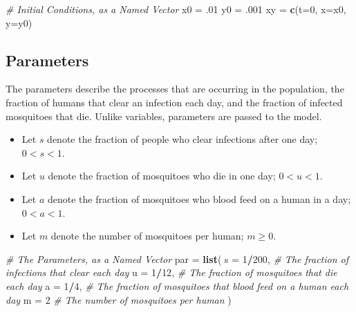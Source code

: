 \documentclass[
]{book}
\newenvironment{Shaded}{\begin{snugshade}}{\end{snugshade}}
\newcommand{\AttributeTok}[1]{\textcolor[rgb]{0.13,0.29,0.53}{#1}}
\newcommand{\CommentTok}[1]{\textcolor[rgb]{0.56,0.35,0.01}{\textit{#1}}}
\newcommand{\DecValTok}[1]{\textcolor[rgb]{0.00,0.00,0.81}{#1}}
\newcommand{\FunctionTok}[1]{\textcolor[rgb]{0.13,0.29,0.53}{\textbf{#1}}}
\newcommand{\NormalTok}[1]{#1}
\newcommand{\OtherTok}[1]{\textcolor[rgb]{0.56,0.35,0.01}{#1}}
\newcommand{\SpecialCharTok}[1]{\textcolor[rgb]{0.81,0.36,0.00}{\textbf{#1}}}
\begin{document}
\begin{Shaded}
\begin{Highlighting}[]
\CommentTok{\# Initial Conditions, as a Named Vector}
\NormalTok{x0 }\OtherTok{=}\NormalTok{ .}\DecValTok{01}
\NormalTok{y0 }\OtherTok{=}\NormalTok{ .}\DecValTok{001}
\NormalTok{xy }\OtherTok{=} \FunctionTok{c}\NormalTok{(}\AttributeTok{t=}\DecValTok{0}\NormalTok{, }\AttributeTok{x=}\NormalTok{x0, }\AttributeTok{y=}\NormalTok{y0)}
\end{Highlighting}
\end{Shaded}

\subsection{Parameters}\label{parameters}

The parameters describe the processes that are occurring in the population, the fraction of humans that clear an infection each day, and the fraction of infected mosquitoes that die. Unlike variables, parameters are passed to the model.

\begin{itemize}
\item
  Let \(s\) denote the fraction of people who clear infections after one day; \(0 < s < 1.\)
\item
  Let \(u\) denote the fraction of mosquitoes who die in one day; \(0 < u < 1.\)
\item
  Let \(a\) denote the fraction of mosquitoes who blood feed on a human in a day; \(0 < a < 1.\)
\item
  Let \(m\) denote the number of mosquitoes per human; \(m \geq 0.\)
\end{itemize}

\begin{Shaded}
\begin{Highlighting}[]
\CommentTok{\# The Parameters, as a Named Vector}
\NormalTok{par }\OtherTok{=} \FunctionTok{list}\NormalTok{(}
  \AttributeTok{s =} \DecValTok{1}\SpecialCharTok{/}\DecValTok{200}\NormalTok{, }\CommentTok{\# The fraction of infections that clear each day}
  \AttributeTok{u =} \DecValTok{1}\SpecialCharTok{/}\DecValTok{12}\NormalTok{,  }\CommentTok{\# The fraction of mosquitoes that die each day}
  \AttributeTok{a =} \DecValTok{1}\SpecialCharTok{/}\DecValTok{4}\NormalTok{,   }\CommentTok{\# The fraction of mosquitoes that blood feed on a human each day}
  \AttributeTok{m =} \DecValTok{2}      \CommentTok{\# The number of mosquitoes per human}
\NormalTok{) }
\end{Highlighting}
\end{Shaded}
\end{document}
